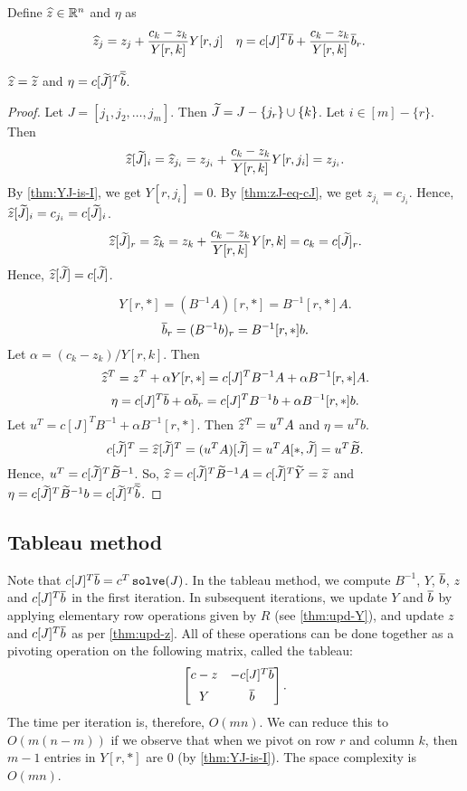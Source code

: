 Define $\widehat{z} \in \mathbb{R}^n$ and $\eta$ as
\begin{align*}
\widehat{z}_j &= z_j + \frac{c_k - z_k}{Y[r,k]} Y[r,j]
& \eta &= c[J]^T\overline{b} + \frac{c_k - z_k}{Y[r, k]}\overline{b}_r.
\end{align*}

\begin{lemma}
\label{thm:upd-z}
$\widehat{z} = \widetilde{z}$ and $\eta = c[\widetilde{J}]^T\overline{\widetilde{b}}$.
\end{lemma}
\begin{proof}
Let $J = [j_1, j_2, \ldots, j_m]$. Then $\widetilde{J} = J - \{j_r\} \cup \{k\}$.
Let $i \in [m] - \{r\}$. Then
\[ \widehat{z}[\widetilde{J}]_i = \widehat{z}_{j_i} = z_{j_i} + \frac{c_k - z_k}{Y[r,k]} Y[r,j_i] = z_{j_i}. \]
By \cref{thm:YJ-is-I}, we get $Y[r,j_i] = 0$.
By \cref{thm:zJ-eq-cJ}, we get $z_{j_i} = c_{j_i}$.
Hence, $\widehat{z}[\widetilde{J}]_i = c_{j_i} = c[\widetilde{J}]_i$.
\[ \widehat{z}[\widetilde{J}]_r = \widehat{z}_k = z_k + \frac{c_k - z_k}{Y[r,k]} Y[r,k] = c_k = c[\widetilde{J}]_r. \]
Hence, $\widehat{z}[\widetilde{J}] = c[\widetilde{J}]$.

\[ Y[r,*] = (B^{-1}A)[r,*] = B^{-1}[r,*]A. \]
\[ \overline{b}_r = (B^{-1}b)_r = B^{-1}[r,*]b. \]
Let $\alpha = (c_k - z_k)/Y[r,k]$. Then
\[ \widehat{z}^T = z^T + \alpha Y[r,*] = c[J]^TB^{-1}A + \alpha B^{-1}[r,*]A. \]
\[ \eta = c[J]^T\overline{b} + \alpha \overline{b}_r = c[J]^TB^{-1}b + \alpha B^{-1}[r,*]b. \]
Let $u^T = c[J]^TB^{-1} + \alpha B^{-1}[r,*]$. Then $\widehat{z}^T = u^TA$ and $\eta = u^Tb$.
\[ c[\widetilde{J}]^T = \widehat{z}[\widetilde{J}]^T = (u^TA)[\widetilde{J}] = u^TA[*,\widetilde{J}] = u^T\widetilde{B}. \]
Hence, $u^T = c[\widetilde{J}]^T\widetilde{B}^{-1}$.
So, $\widehat{z} = c[\widetilde{J}]^T\widetilde{B}^{-1}A = c[\widetilde{J}]^T\widetilde{Y} = \widetilde{z}$
and $\eta = c[\widetilde{J}]^T\widetilde{B}^{-1}b = c[\widetilde{J}]^T\overline{\widetilde{b}}$.
\end{proof}

\subsection{Tableau method}

Note that $c[J]^T\overline{b} = c^T\operatorname{\mathtt{solve}}(J)$.
In the tableau method, we compute $B^{-1}$, $Y$, $\overline{b}$, $z$ and $c[J]^T\overline{b}$ in the first iteration.
In subsequent iterations, we update $Y$ and $\overline{b}$
by applying elementary row operations given by $R$ (see \cref{thm:upd-Y}),
and update $z$ and $c[J]^T\overline{b}$ as per \cref{thm:upd-z}.
All of these operations can be done together as a pivoting operation
on the following matrix, called the tableau:
\[ \begin{bmatrix} c - z & -c[J]^T\overline{b} \\[0.5em] Y & \overline{b} \end{bmatrix}. \]
The time per iteration is, therefore, $O(mn)$.
We can reduce this to $O(m(n-m))$ if we observe that when we pivot on row $r$ and column $k$,
then $m-1$ entries in $Y[r,*]$ are 0 (by \cref{thm:YJ-is-I}).
The space complexity is $O(mn)$.

